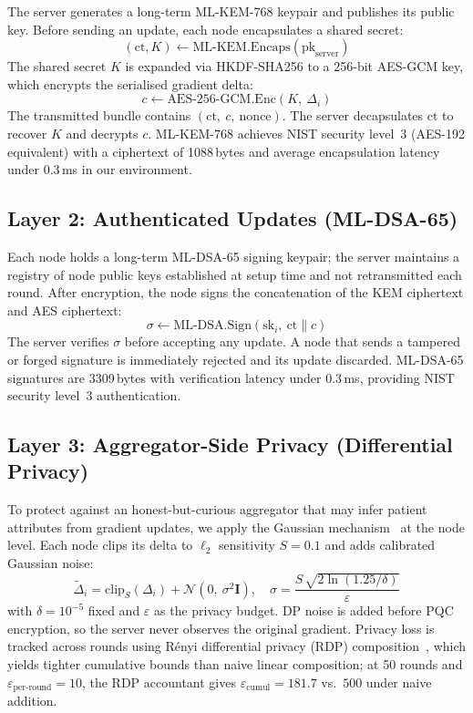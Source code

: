 \documentclass[runningheads]{llncs}
\begin{document}
The server generates a long-term ML-KEM-768 keypair and publishes its
public key.
Before sending an update, each node encapsulates a shared secret:
\begin{equation}
  (\text{ct}, K) \leftarrow \text{ML-KEM.Encaps}(\text{pk}_{\text{server}})
\end{equation}
The shared secret $K$ is expanded via HKDF-SHA256 to a 256-bit
AES-GCM key, which encrypts the serialised gradient delta:
\begin{equation}
  c \leftarrow \text{AES-256-GCM.Enc}(K,\ \Delta_i)
\end{equation}
The transmitted bundle contains $(\text{ct},\ c,\ \text{nonce})$.
The server decapsulates $\text{ct}$ to recover $K$ and decrypts $c$.
ML-KEM-768 achieves NIST security level~3 (AES-192 equivalent) with a
ciphertext of 1088\,bytes and average encapsulation latency under
0.3\,ms in our environment.

\subsection{Layer 2: Authenticated Updates (ML-DSA-65)}

Each node holds a long-term ML-DSA-65 signing keypair; the server
maintains a registry of node public keys established at setup time
and not retransmitted each round.
After encryption, the node signs the concatenation of the KEM
ciphertext and AES ciphertext:
\begin{equation}
  \sigma \leftarrow \text{ML-DSA.Sign}(\text{sk}_i,\ \text{ct} \| c)
\end{equation}
The server verifies $\sigma$ before accepting any update.
A node that sends a tampered or forged signature is immediately
rejected and its update discarded.
ML-DSA-65 signatures are 3309\,bytes with verification latency under
0.3\,ms, providing NIST security level~3 authentication.

\subsection{Layer 3: Aggregator-Side Privacy (Differential Privacy)}

To protect against an honest-but-curious aggregator that may infer
patient attributes from gradient updates, we apply the Gaussian
mechanism~\cite{dwork2006} at the node level.
Each node clips its delta to $\ell_2$ sensitivity $S = 0.1$ and adds
calibrated Gaussian noise:
\begin{equation}
  \tilde{\Delta}_i = \text{clip}_{S}(\Delta_i)
    + \mathcal{N}(0,\ \sigma^2 \mathbf{I}), \quad
  \sigma = \frac{S\,\sqrt{2\ln(1.25/\delta)}}{\varepsilon}
\end{equation}
with $\delta = 10^{-5}$ fixed and $\varepsilon$ as the privacy budget.
DP noise is added before PQC encryption, so the server never observes
the original gradient.
Privacy loss is tracked across rounds using R\'{e}nyi differential
privacy (RDP) composition~\cite{mironov2017rdp}, which yields tighter
cumulative bounds than naive linear composition; at 50 rounds and
$\varepsilon_{\text{per-round}}=10$, the RDP accountant gives
$\varepsilon_{\text{cumul}}=181.7$ vs.\ $500$ under naive addition.
\end{document}
